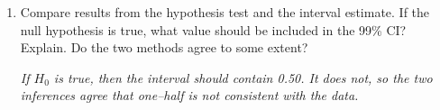 \begin{enumerate}
\begin{enumerate}
\begin{enumerate}
     \item Compute a 99\% confidence interval.
\begin{students}
    \vspace{1.2cm}    
\end{students}

\begin{key} 
  $  (0.532, 0.742)$
\end{key}
     \item Explain what the word ``confidence'' means for this
       situation.
\begin{students}
    \vspace{3cm}    
\end{students}

\begin{key} 
  {\it Our confidence is in the process, not in just one interval. If
    we repeat the process (gather a new random sample) over and over,
    99\% of the intervals we create will include the true parameter of
  interest.}
\end{key}

  \end{enumerate}
\item Compare results from the hypothesis test and the interval
  estimate.  If the null hypothesis is true, what value should be
  included in the 99\% CI?  Explain. Do the two methods agree to some
  extent? 
\begin{students}
    \vspace{4.2cm}    
\end{students}

\begin{key} 
  {\it  If $H_0$ is true, then the interval should contain 0.50.  It
    does not, so the two inferences agree that one--half is not
    consistent with the data.} 
\end{key}

    \end{enumerate}
  \end{enumerate}
  

